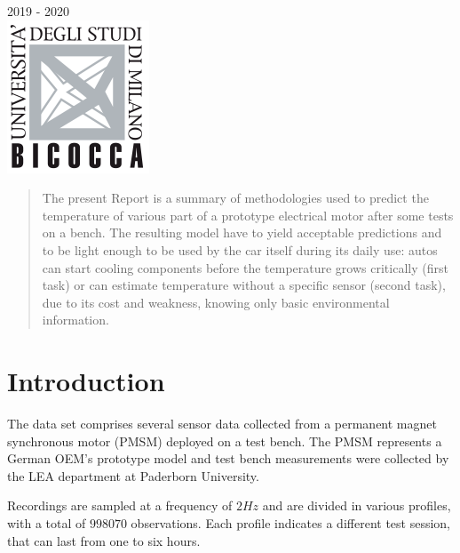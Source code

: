 \begin{titlepage}
{\large 2019 - 2020}\\[1cm] %


\includegraphics{imgs/logo.png}\\[1cm] %
 

\vfill %

\end{titlepage}


\begin{abstract}
  The present Report is a summary of methodologies used to predict the temperature of various part of a prototype electrical motor after some tests on a bench. The resulting model have to yield acceptable predictions and to be light enough to be used by the car itself during its daily use: autos can start cooling components before the temperature grows critically (first task) or can estimate temperature without a specific sensor (second task), due to its cost and weakness, knowing only basic environmental information.
\end{abstract}

\section{Introduction}
The data set comprises several sensor data collected from a permanent magnet synchronous motor (PMSM) deployed on a test bench. The PMSM represents a German OEM's prototype model and test bench measurements were collected by the LEA department at Paderborn University.

Recordings are sampled at a frequency of $2Hz$ and are divided in various profiles, with a total of $998070$ observations. Each profile indicates a different test session, that can last from one to six hours.

